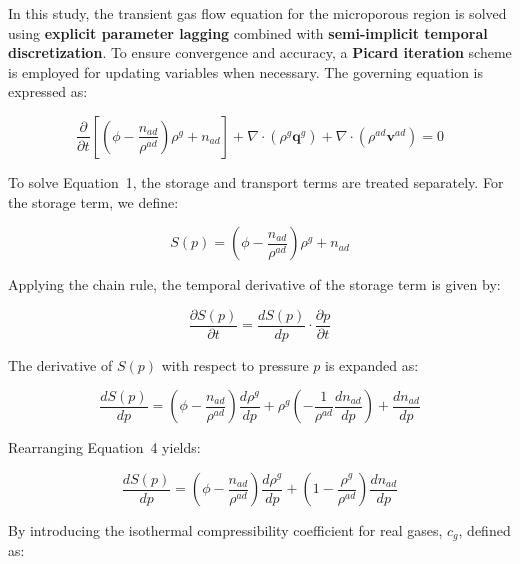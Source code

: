 \documentclass{article}
\begin{document}
In this study, the transient gas flow equation for the microporous region is solved using \textbf{explicit parameter lagging} combined with \textbf{semi-implicit temporal discretization}. To ensure convergence and accuracy, a \textbf{Picard iteration} scheme is employed for updating variables when necessary. The governing equation is expressed as:

\begin{equation}
    \frac{\partial}{\partial t}\left[\left(\phi-\frac{n_{ad}}{\rho^{ad}}\right) \rho^{g}+n_{ad}\right]+\nabla \cdot\left(\rho^{g} \mathbf{q}^{g}\right)+\nabla \cdot\left(\rho^{ad} \mathbf{v}^{ad}\right)=0
\end{equation}

To solve Equation~1, the storage and transport terms are treated separately. For the storage term, we define:

\begin{equation}
    S(p)=\left(\phi -\frac{n_{ad}}{\rho^{ad}}\right) \rho^{g}+n_{ad}
\end{equation}

Applying the chain rule, the temporal derivative of the storage term is given by:

\begin{equation}
    \frac{\partial S(p)}{\partial t}=\frac{d S(p)}{d p} \cdot \frac{\partial p}{\partial t}
\end{equation}

The derivative of $S(p)$ with respect to pressure $p$ is expanded as:

\begin{equation}
    \frac{d S(p)}{d p}=\left(\phi-\frac{n_{ad}}{\rho^{ad}}\right) \frac{d \rho^{g}}{d p}+\rho^{g}\left(-\frac{1}{\rho^{ad}} \frac{d n_{ad}}{d p}\right)+\frac{d n_{ad}}{d p}
\end{equation}


Rearranging Equation~4 yields:

\begin{equation}
    \frac{d S(p)}{d p}=\left(\phi-\frac{n_{ad}}{\rho^{ad}}\right) \frac{d \rho^{g}}{d p}+\left(1-\frac{\rho^{g}}{\rho^{ad}}\right) \frac{d n_{ad}}{d p}
\end{equation}

By introducing the isothermal compressibility coefficient for real gases, $c_g$, defined as:
\end{document}
